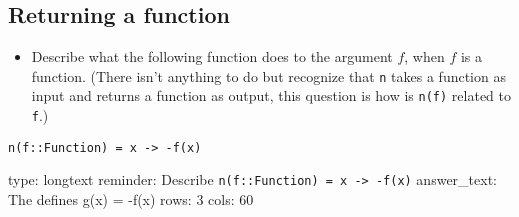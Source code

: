 \documentclass[12pt]{article}
\begin{document}
\subsection{Returning a function}

\begin{itemize}
\itemsep1pt\parskip0pt
\item
  Describe what the following function does to the argument $f$, when
  $f$ is a function. (There isn't anything to do but recognize that
  \texttt{n} takes a function as input and returns a function as output,
  this question is how is \texttt{n(f)} related to \texttt{f}.)
\end{itemize}



\begin{verbatim}
n(f::Function) = x -> -f(x)
\end{verbatim}
\begin{answer}
type: longtext
reminder: Describe \verb+n(f::Function) = x -> -f(x)+
answer_text: The defines g(x) = -f(x) 
rows: 3
cols: 60
\end{answer}
\end{document}
